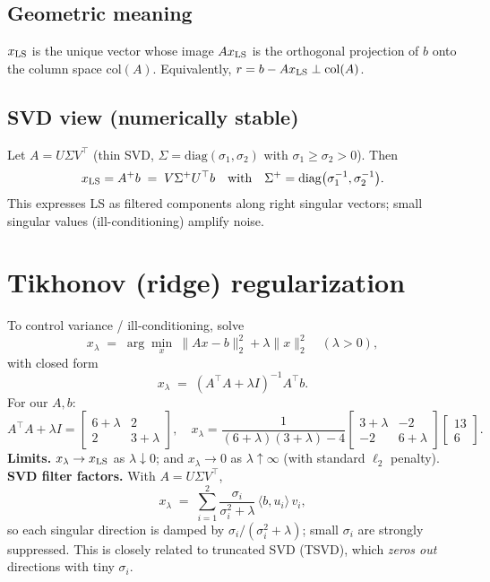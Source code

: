 \documentclass[12pt,a4paper]{article}
\begin{document}
\subsection*{Geometric meaning}
$x_{\rm LS}$ is the unique vector whose image $Ax_{\rm LS}$ is the orthogonal projection of $b$ onto the column space $\mathrm{col}(A)$. Equivalently,
$r=b-Ax_{\rm LS}\perp \mathrm{col}(A)$.

\subsection*{SVD view (numerically stable)}
Let $A=U\Sigma V^\top$ (thin SVD, $\Sigma=\mathrm{diag}(\sigma_1,\sigma_2)$ with $\sigma_1\ge\sigma_2>0$). Then
\[
x_{\rm LS}=A^{+}b \;=\; V\Sigma^{+}U^\top b
\quad\text{with}\quad
\Sigma^{+}=\mathrm{diag}\bigl(\sigma_1^{-1},\sigma_2^{-1}\bigr).
\]
This expresses LS as filtered components along right singular vectors; small singular values (ill-conditioning) amplify noise.

\section{Tikhonov (ridge) regularization}
To control variance / ill-conditioning, solve
\[
x_\lambda \;=\; \arg\min_{x}\ \|Ax-b\|_2^2 + \lambda\|x\|_2^2
\quad(\lambda>0),
\]
with closed form
\[
x_\lambda \;=\; (A^\top A + \lambda I)^{-1}A^\top b .
\]
For our $A,b$:
\[
A^\top A + \lambda I =
\begin{bmatrix}6+\lambda & 2\\[2pt] 2 & 3+\lambda\end{bmatrix},\quad
x_\lambda
=\frac{1}{(6+\lambda)(3+\lambda)-4}
\begin{bmatrix}3+\lambda & -2\\[2pt] -2 & 6+\lambda\end{bmatrix}
\begin{bmatrix}13\\[2pt]6\end{bmatrix}.
\]
\textbf{Limits.} $x_\lambda\to x_{\rm LS}$ as $\lambda\downarrow 0$; and $x_\lambda\to 0$ as $\lambda\uparrow\infty$ (with standard $\ell_2$ penalty).\\[4pt]
\textbf{SVD filter factors.} With $A=U\Sigma V^\top$,
\[
x_\lambda \;=\; \sum_{i=1}^{2} \frac{\sigma_i}{\sigma_i^2+\lambda}\,\langle b, u_i\rangle\, v_i,
\]
so each singular direction is damped by $\sigma_i/(\sigma_i^2+\lambda)$; small $\sigma_i$ are strongly suppressed.
This is closely related to truncated SVD (TSVD), which \emph{zeros out} directions with tiny $\sigma_i$.
\end{document}
